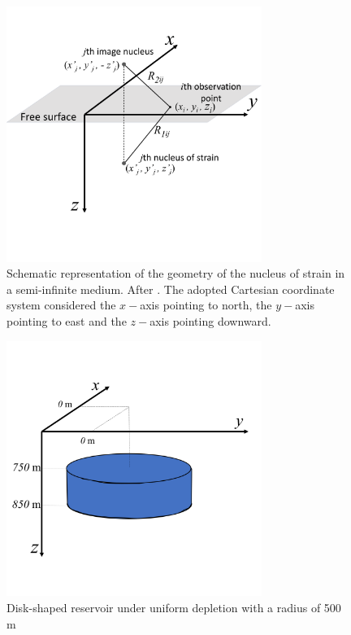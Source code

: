 \documentclass[journal abbreviation, manuscript]{copernicus}
\begin{document}
\clearpage

\begin{figure}[ht]
\includegraphics[width=8.3cm]{Fig/Figure_Nucleus_Strain.png}
\caption{Schematic representation of the geometry of the nucleus of strain in a semi-infinite medium. After \cite{Munoz&Roehl17}. 
The adopted Cartesian coordinate system considered the $x-$axis pointing to north, the $y-$axis pointing to east and the $z-$axis pointing downward.} 
\label{fig:nucleus_strain}
\end{figure}


\begin{figure}[ht]
\includegraphics[width=8.3cm]{Fig/Figure_Cylinder.png}
\caption{Disk-shaped reservoir under uniform depletion with a radius of 500 m}
\label{fig:cylinder}
\end{figure}
\end{document}
